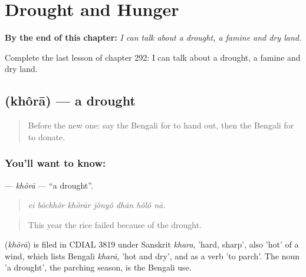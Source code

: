 
\chapter{Drought and Hunger}
\label{ch:bn-drought-and-hunger}

\begin{chapteropening}
\textbf{By the end of this chapter:} \emph{I can talk about a drought, a famine and dry land.}

Complete the last lesson of chapter 292: I can talk about a drought, a famine and dry land.
\end{chapteropening}

\section[\texorpdfstring{\bn{খরা} (khôrā)}{খরা (khôrā)}]{ (khôrā) — a drought}

\label{lesson:BN-C292-khora}



\begin{quote}
Before the new one: say the Bengali for to hand out, then the Bengali for to donate.
\end{quote}

\subsection*{You'll want to know: }
\textbf{} — \emph{khôrā} — \textquotedblleft{}a drought\textquotedblright{}.

\begin{quote}
      
\end{quote}

\begin{quote}
\emph{ei bôchhôr khôrār jônyô dhān hôlô nā.}
\end{quote}

\begin{quote}
This year the rice failed because of the drought.
\end{quote}

\begin{cousinweb}
\textbf{} (\emph{khôrā}) is filed in CDIAL 3819 under Sanskrit \emph{khara}, 'hard, sharp', also 'hot' of a wind, which lists Bengali \emph{kharā}, 'hot and dry', and as a verb 'to parch'. The noun 'a drought', the parching season, is the Bengali use.
\end{cousinweb}

